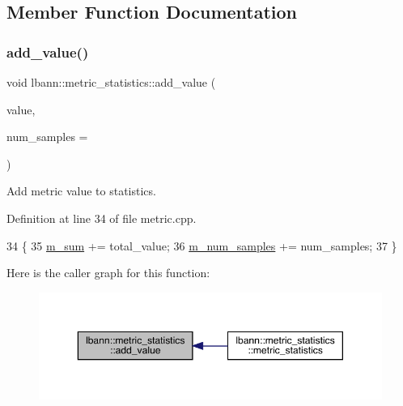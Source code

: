 \subsection{Member Function Documentation}
\mbox{\label{structlbann_1_1metric__statistics_a1933a2417f08d99b1ddfa2b883dae68a}} 
\subsubsection{\texorpdfstring{add\+\_\+value()}{add\_value()}}
{\footnotesize\ttfamily void lbann\+::metric\+\_\+statistics\+::add\+\_\+value (\begin{DoxyParamCaption}\item[{\hyperlink{base_8hpp_a3266f5ac18504bbadea983c109566867}{Eval\+Type}}]{value,  }\item[{int}]{num\+\_\+samples = {} }\end{DoxyParamCaption})}

Add metric value to statistics. 

Definition at line 34 of file metric.\+cpp.


\begin{DoxyCode}
34                                                                        \{
35   \hyperlink{structlbann_1_1metric__statistics_a3481b2bb165e12a52db847f40a70f800}{m\_sum} += total\_value;
36   \hyperlink{structlbann_1_1metric__statistics_a6633bf91863b7e2327563ac93a9783f7}{m\_num\_samples} += num\_samples;
37 \}
\end{DoxyCode}
Here is the caller graph for this function\+:\nopagebreak
\begin{figure}[H]
\begin{center}
\leavevmode
\includegraphics[width=350pt]{structlbann_1_1metric__statistics_a1933a2417f08d99b1ddfa2b883dae68a_icgraph}
\end{center}
\end{figure}
\mbox{\label{structlbann_1_1metric__statistics_ac3cb1abfc32b090fa2a08bda6afa5c09}} 
